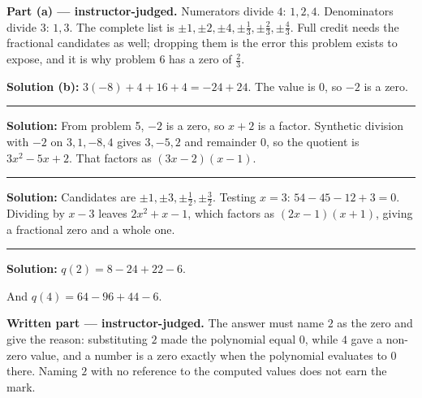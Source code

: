\documentclass[12pt]{article}
\begin{document}

\textbf{Part (a) --- instructor-judged.} Numerators divide $4$: $1, 2, 4$.
Denominators divide $3$: $1, 3$. The complete list is
$\pm 1, \pm 2, \pm 4, \pm \tfrac{1}{3}, \pm \tfrac{2}{3}, \pm \tfrac{4}{3}$.
Full credit needs the fractional candidates as well; dropping them is the error
this problem exists to expose, and it is why problem 6 has a zero of
$\tfrac{2}{3}$.

\textbf{Solution (b):} $3(-8) + 4 + 16 + 4 = -24 + 24$. The value is $0$, so
$-2$ is a zero. 

\vspace{0.15cm}
\noindent\rule{\linewidth}{0.2pt}


\textbf{Solution:} From problem 5, $-2$ is a zero, so $x + 2$ is a factor.
Synthetic division with $-2$ on $3, 1, -8, 4$ gives $3, -5, 2$ and remainder
$0$, so the quotient is $3x^{2} - 5x + 2$. That factors as $(3x - 2)(x - 1)$.

\vspace{0.15cm}
\noindent\rule{\linewidth}{0.2pt}


\textbf{Solution:} Candidates are
$\pm 1, \pm 3, \pm \tfrac{1}{2}, \pm \tfrac{3}{2}$. Testing $x = 3$:
$54 - 45 - 12 + 3 = 0$. Dividing by $x - 3$ leaves $2x^{2} + x - 1$, which
factors as $(2x - 1)(x + 1)$, giving a fractional zero and a whole one.

\vspace{0.15cm}
\noindent\rule{\linewidth}{0.2pt}


\textbf{Solution:} $q(2) = 8 - 24 + 22 - 6$. 

\noindent And $q(4) = 64 - 96 + 44 - 6$. 

\textbf{Written part --- instructor-judged.} The answer must name $2$ as the
zero and give the reason: substituting $2$ made the polynomial equal $0$, while
$4$ gave a non-zero value, and a number is a zero exactly when the polynomial
evaluates to $0$ there. Naming $2$ with no reference to the computed values does
not earn the mark.
\end{document}
